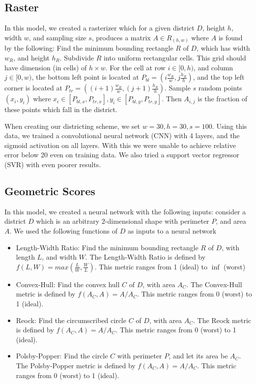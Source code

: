 \documentclass{article}
\begin{document}
\subsection{Raster}
In this model, we created a rasterizer which for a given district $D$, height
$h$, width $w$, and sampling size $s$, produces a matrix $A\in R_{(h, w)}$
where $A$ is found by the following: Find the minimum bounding rectangle $R$ of
$D$, which has width $w_R$, and height $h_R$. Subdivide $R$ into uniform
rectangular cells. This grid should have dimension (in cells) of $h\times w$.
For the cell at row $i\in[0, h)$, and column $j\in[0, w)$, the bottom left
point is located at $P_{bl}=(i\frac{w_R}{w}, j\frac{h_R}{h})$, and the top left
corner is located at $P_{tr}=((i+1)\frac{w_R}{w}, (j+1)\frac{h_R}{h})$. Sample
$s$ random points $(x_i, y_i)$ where $x_i\in [P_{bl, x}, P_{tr, x}], y_i\in
	[P_{bl, y}, P_{tr, y}]$. Then $A_{i, j}$ is the fraction of these points which
fall in the district.

When creating our districting scheme, we set $w=30, h=30, s=100$. Using this
data, we trained a convolutional neural network (CNN) with 4 layers, and the
sigmoid activation on all layers. With this we were unable to achieve relative
error below 20 even on training data. We also tried a support vector regressor
(SVR) with even poorer results.

\subsection{Geometric Scores}
In this model, we created a neural network with the following inputs: consider
a district $D$ which is an arbitrary 2-dimensional shape with perimeter $P$,
and area $A$. We used the following functions of $D$ as inputs to a neural
network
\begin{itemize}
	\item Length-Width Ratio: Find the minimum bounding rectangle $R$ of $D$, with length
	      $L$, and width $W$. The Length-Width Ratio is defined by$f(L, W) =
		      max(\frac{L}{W}, \frac{W}{L})$. This metric ranges from 1 (ideal) to $\inf$
	      (worst)
	\item Convex-Hull: Find the convex hull $C$ of $D$, with area $A_C$. The Convex-Hull
	      metric is defined by $f(A_C, A) = A / A_C$. This metric ranges from 0 (worst)
	      to 1 (ideal).
	\item Reock: Find the circumscribed circle $C$ of $D$, with area $A_C$. The Reock
	      metric is defined by $f(A_C, A) = A / A_C$. This metric ranges from 0 (worst)
	      to 1 (ideal).
	\item Polsby-Popper: Find the circle $C$ with perimeter $P$, and let its area be
	      $A_C$. The Polsby-Popper metric is defined by $f(A_C, A) = A / A_C$. This
	      metric ranges from 0 (worst) to 1 (ideal).
\end{itemize}
\end{document}
